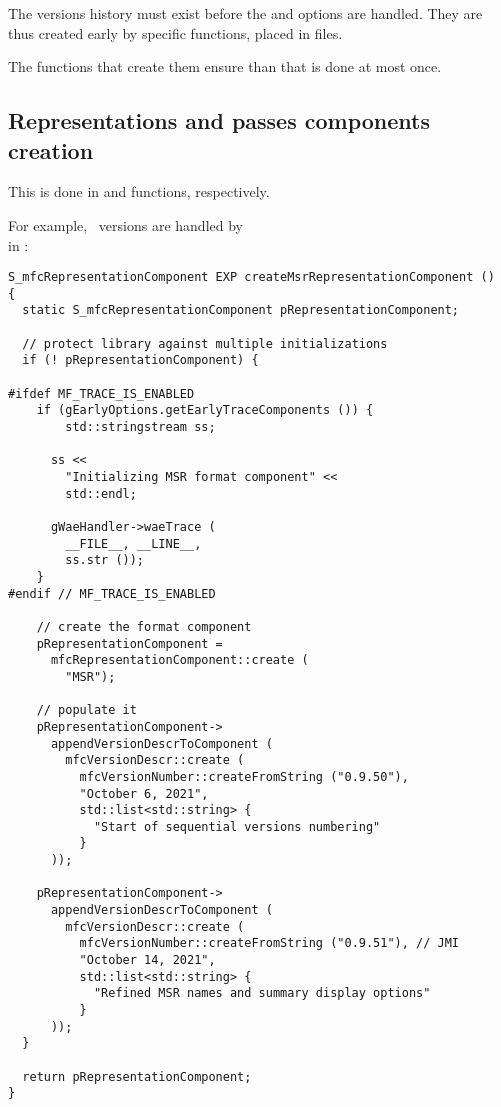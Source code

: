 The versions history must exist before the  and  options are handled. They are thus created early by specific functions, placed in  files.

The functions that create them ensure than that is done at most once.


\subsection{Representations and passes components creation}\label{Representations and passes components creation}

This is done in  and  functions, respectively.

For example, \msrRepr\ versions are handled by  \\
in :
\begin{lstlisting}[language=CPlusPlus]
S_mfcRepresentationComponent EXP createMsrRepresentationComponent ()
{
  static S_mfcRepresentationComponent pRepresentationComponent;

  // protect library against multiple initializations
  if (! pRepresentationComponent) {

#ifdef MF_TRACE_IS_ENABLED
    if (gEarlyOptions.getEarlyTraceComponents ()) {
	  	std::stringstream ss;

      ss <<
        "Initializing MSR format component" <<
        std::endl;

      gWaeHandler->waeTrace (
        __FILE__, __LINE__,
        ss.str ());
    }
#endif // MF_TRACE_IS_ENABLED

    // create the format component
    pRepresentationComponent =
      mfcRepresentationComponent::create (
        "MSR");

    // populate it
    pRepresentationComponent->
      appendVersionDescrToComponent (
        mfcVersionDescr::create (
          mfcVersionNumber::createFromString ("0.9.50"),
          "October 6, 2021",
          std::list<std::string> {
            "Start of sequential versions numbering"
          }
      ));

    pRepresentationComponent->
      appendVersionDescrToComponent (
        mfcVersionDescr::create (
          mfcVersionNumber::createFromString ("0.9.51"), // JMI
          "October 14, 2021",
          std::list<std::string> {
            "Refined MSR names and summary display options"
          }
      ));
  }

  return pRepresentationComponent;
}
\end{lstlisting}

